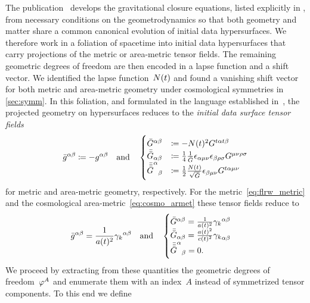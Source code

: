 The publication~\autocite{Schuller2016} develops the gravitational closure equations, listed explicitly in , from necessary conditions on the geometrodynamics so that both geometry and matter share a common canonical evolution of initial data hypersurfaces. We therefore work in a foliation of spacetime into initial data hypersurfaces that carry projections of the metric or area-metric tensor fields. The remaining geometric degrees of freedom are then encoded in a lapse function and a shift vector. We identified the lapse function~$N(t)$ and found a vanishing shift vector for both metric and area-metric geometry under cosmological symmetries in \autoref{sec:symm}. In this foliation, and formulated in the language established in~\autocite{Schuller2016}, the projected geometry on hypersurfaces reduces to the \emph{initial data surface tensor fields}
\begin{equation}
	{\bar{g}}^{\alpha\beta}\coloneqq-g^{\alpha\beta} \quad \text{and} \quad \begin{cases}
		{\bar{G}}^{\alpha\beta}&\coloneqq-N(t)^2G^{t\alpha t\beta}\\
		{\bar{{\bar{G}}}}_{\alpha\beta}&\coloneqq\frac{1}{4}\frac{1}{{\bar{G}}}\epsilon_{\alpha\mu\nu}\epsilon_{\beta\rho\sigma}G^{\mu\nu\rho\sigma}\\
		{{\bar{{\bar{{\bar{G}}}}}}^\alpha}_\beta&\coloneqq\frac{1}{2}\frac{N(t)}{\sqrt{{\bar{G}}}}\epsilon_{\beta\mu\nu}G^{t\alpha\mu\nu}
	\end{cases}
\end{equation}
for metric and area-metric geometry, respectively. For the \FLRW{} metric~\eqref{eq:flrw_metric} and the cosmological area-metric~\eqref{eq:cosmo_armet} these tensor fields reduce to
\begin{equation}
	{\bar{g}}^{\alpha\beta}=\frac{1}{a(t)^2}{\gamma_{k}}^{\alpha\beta} \quad \text{and} \quad \begin{cases}
		{\bar{G}}^{\alpha\beta}=\frac{1}{a(t)^2}{\gamma_{k}}^{\alpha\beta}\\
		{\bar{{\bar{G}}}}_{\alpha\beta}=\frac{a(t)^2}{c(t)^2}{\gamma_{k}}_{\alpha\beta}\\
		{{\bar{{\bar{{\bar{G}}}}}}^\alpha}_\beta=0
		\mathpunct{.}
	\end{cases}
\end{equation}
We proceed by extracting from these quantities the geometric degrees of freedom~$\varphi^A$ and enumerate them with an index~$A$ instead of symmetrized tensor components. To this end we define

